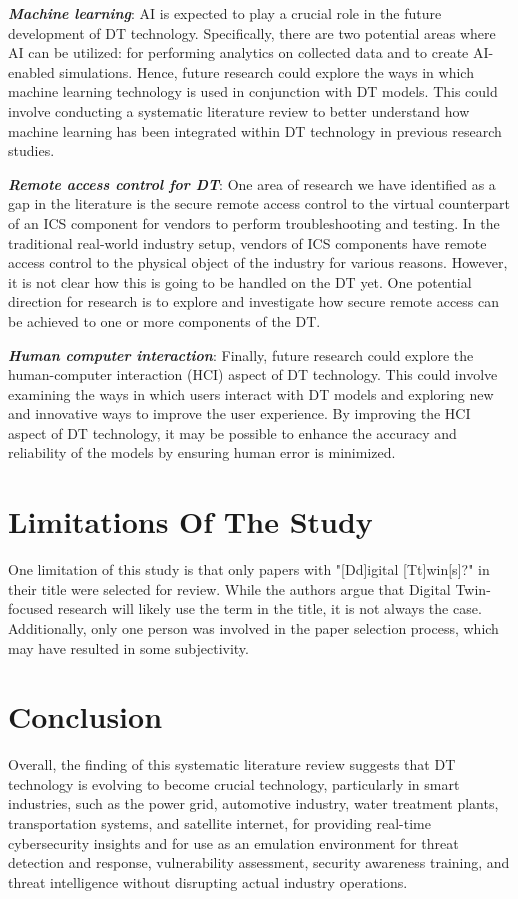 \textbf{\textit{Machine learning}}: AI is expected to play a crucial role in the future development of DT technology. Specifically, there are two potential areas where AI can be utilized: for performing analytics on collected data and to create AI-enabled simulations. Hence, future research could explore the ways in which machine learning technology is used in conjunction with DT models. This could involve conducting a systematic literature review to better understand how machine learning has been integrated within DT technology in previous research studies.

\textbf{\textit{Remote access control for DT}}: One area of research we have identified as a gap in the literature is the secure remote access control to the virtual counterpart of an ICS component for vendors to perform troubleshooting and testing. In the traditional real-world industry setup, vendors of ICS components have remote access control to the physical object of the industry for various reasons. However, it is not clear how this is going to be handled on the DT yet. One potential direction for research is to explore and investigate how secure remote access can be achieved to one or more components of the DT.

\textbf{\textit{Human computer interaction}}: Finally, future research could explore the human-computer interaction (HCI) aspect of DT technology. This could involve examining the ways in which users interact with DT models and exploring new and innovative ways to improve the user experience. By improving the HCI aspect of DT technology, it may be possible to enhance the accuracy and reliability of the models by ensuring human error is minimized.

\section{Limitations Of The Study}

One limitation of this study is that only papers with "[Dd]igital [Tt]win[s]?" in their title were selected for review. While the authors argue that Digital Twin-focused research will likely use the term in the title, it is not always the case. Additionally, only one person was involved in the paper selection process, which may have resulted in some subjectivity.

\section{Conclusion}
Overall, the finding of this systematic literature review suggests that DT technology is evolving to become crucial technology, particularly in smart industries, such as the power grid, automotive industry, water treatment plants, transportation systems, and satellite internet, for providing real-time cybersecurity insights and for use as an emulation environment for threat detection and response, vulnerability assessment, security awareness training, and threat intelligence without disrupting actual industry operations. 

